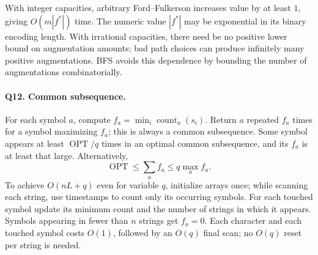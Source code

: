 \documentclass[10pt]{article}
\theoremstyle{definition}
\newcommand{\OPT}{\operatorname{OPT}}
\begin{document}
With integer capacities, arbitrary Ford--Fulkerson increases value by at
least $1$, giving $O(m|f^*|)$ time.  The numeric value $|f^*|$ may be
exponential in its binary encoding length.  With irrational capacities,
there need be no positive lower bound on augmentation amounts; bad path
choices can produce infinitely many positive augmentations.  BFS avoids
this dependence by bounding the number of augmentations combinatorially.

\paragraph{Q12. Common subsequence.}
For each symbol $a$, compute $f_a=\min_i\operatorname{count}_a(s_i)$.
Return $a$ repeated $f_a$ times for a symbol maximizing $f_a$; this is
always a common subsequence.  Some symbol appears at least $\OPT/q$ times
in an optimal common subsequence, and its $f_a$ is at least that large.
Alternatively,
\[
\OPT\le\sum_a f_a\le q\max_a f_a.
\]
To achieve $O(nL+q)$ even for variable $q$, initialize arrays once; while
scanning each string, use timestamps to count only its occurring symbols.
For each touched symbol update its minimum count and the number of strings
in which it appears.  Symbols appearing in fewer than $n$ strings get
$f_a=0$.  Each character and each touched symbol costs $O(1)$, followed
by an $O(q)$ final scan; no $O(q)$ reset per string is needed.
\end{document}
